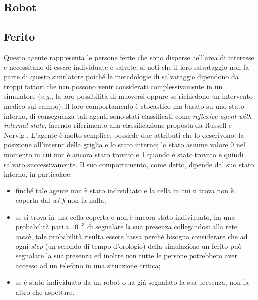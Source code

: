 \subsection{Robot}
\label{sub:robots}
\subsection{Ferito}
Questo agente rappresenta le persone ferite che sono disperse nell'area di interesse e necessitano di essere individuate e salvate, si noti che il loro salvataggio non fa parte di questo simulatore poiché le metodologie di salvataggio dipendono da troppi fattori che non possono venir considerati complessivamente in un simulatore (\textit{e.g.}, la loro possibilità di muoversi oppure se richiedono un intervento medico sul campo).
Il loro comportamento è stocastico ma basato su uno stato interno, di conseguenza tali agenti sono stati classificati come \textit{reflexive agent with internal state}, facendo riferimento alla classificazione proposta da Russell e Norvig \cite{russell2016}.
L'agente è molto semplice, possiede due attributi che lo descrivono: la posizione all'interno della griglia e lo stato interno; lo stato assume valore 0 nel momento in cui non è ancora stato trovato e 1 quando è stato trovato e quindi salvato successivamente.
Il suo comportamento, come detto, dipende dal suo stato interno, in particolare: 
\begin{itemize}
	\item finché tale agente non è stato individuato e la cella in cui si trova non è coperta dal \textit{wi-fi} non fa nulla;
	\item se si trova in una cella coperta e non è ancora stato individuato, ha una probabilità pari a $10^{-3}$ di segnalare la sua presenza collegandosi alla rete \textit{mesh}, tale probabilità risulta essere bassa perché bisogna considerare che ad ogni \textit{step} (un secondo di tempo d'orologio) della simulazione un ferito può segnalare la sua presenza ed inoltre non tutte le persone potrebbero aver accesso ad un telefono in una situazione critica;
	\item se è stato individuato da un robot o ha già segnalato la sua presenza, non fa altro che aspettare.
\end{itemize}
